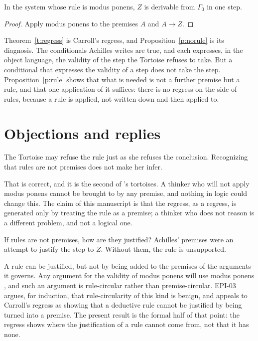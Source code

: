 \documentclass{situationist-preprint}
\begin{document}
\begin{proposition}\label{p:rule}
In the system whose rule is modus ponens, $Z$ is derivable from $\Gamma_0$ in one step.
\end{proposition}

\begin{proof}
Apply modus ponens to the premises $A$ and $A \to Z$.
\end{proof}

Theorem~\ref{t:regress} is Carroll's regress, and Proposition~\ref{p:norule} is its diagnosis. The conditionals Achilles writes are true, and each expresses, in the object language, the validity of the step the Tortoise refuses to take. But a conditional that expresses the validity of a step does not take the step. Proposition~\ref{p:rule} shows that what is needed is not a further premise but a rule, and that one application of it suffices: there is no regress on the side of rules, because a rule is applied, not written down and then applied to.

\section{Objections and replies}

\begin{objection}
The Tortoise may refuse the rule just as she refuses the conclusion. Recognizing that rules are not premises does not make her infer.
\end{objection}

\begin{reply}
That is correct, and it is the second of \citet{Smiley1995}'s tortoises. A thinker who will not apply modus ponens cannot be brought to by any premise, and nothing in logic could change this. The claim of this manuscript is that the regress, as a regress, is generated only by treating the rule as a premise; a thinker who does not reason is a different problem, and not a logical one.
\end{reply}

\begin{objection}
If rules are not premises, how are they justified? Achilles' premises were an attempt to justify the step to $Z$. Without them, the rule is unsupported.
\end{objection}

\begin{reply}
A rule can be justified, but not by being added to the premises of the arguments it governs. Any argument for the validity of modus ponens will use modus ponens \citep{Haack1976}, and such an argument is rule-circular rather than premise-circular. EPI-03 argues, for induction, that rule-circularity of this kind is benign, and appeals to Carroll's regress as showing that a deductive rule cannot be justified by being turned into a premise. The present result is the formal half of that point: the regress shows where the justification of a rule cannot come from, not that it has none.
\end{reply}
\end{document}
